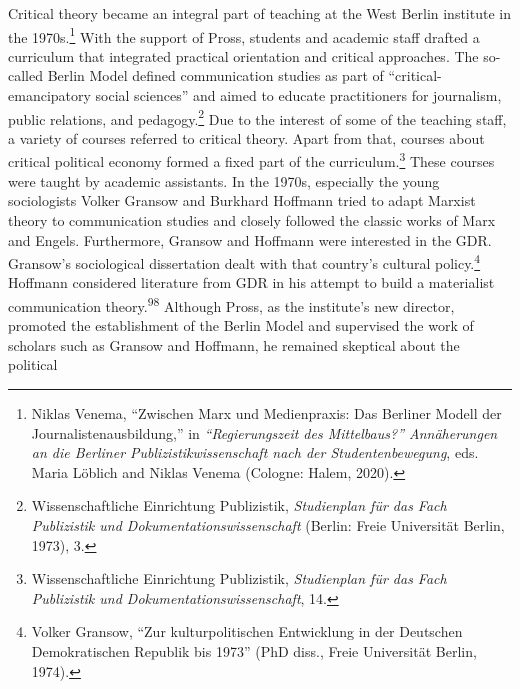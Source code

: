 \documentclass{tufte-handout}
\begin{document}
Critical theory became an integral part of teaching at the West Berlin
institute in the 1970s.\footnote{Niklas Venema, ``Zwischen Marx und
  Medienpraxis: Das Berliner Modell der Journalistenausbildung,'' in
  \emph{``Regierungszeit des Mittelbaus?'' Annäherungen an die Berliner
  Publizistikwissenschaft nach der Studentenbewegung}, eds. Maria
  Löblich and Niklas Venema (Cologne: Halem, 2020).} With the support of
Pross, students and academic staff drafted a curriculum that integrated
practical orientation and critical approaches. The so-called Berlin
Model defined communication studies as part of ``critical-emancipatory
social sciences'' and aimed to educate practitioners for journalism,
public relations, and pedagogy.\footnote{Wissenschaftliche Einrichtung
  Publizistik, \emph{Studienplan für das Fach Publizistik und
  Dokumentationswissenschaft} (Berlin: Freie Universität Berlin, 1973),
  3.} Due to the interest of some of the teaching staff, a variety of
courses referred to critical theory. Apart from that, courses about
critical political economy formed a fixed part of the
curriculum.\footnote{Wissenschaftliche Einrichtung Publizistik,
  \emph{Studienplan für das Fach Publizistik und
  Dokumentationswissenschaft}, 14.} These courses were taught by
academic assistants. In the 1970s, especially the young sociologists
Volker Gransow and Burkhard Hoffmann tried to adapt Marxist theory to
communication studies and closely followed the classic works of Marx and
Engels. Furthermore, Gransow and Hoffmann were interested in the GDR.
Gransow's sociological dissertation dealt with that country's cultural
policy.\footnote{Volker Gransow, ``Zur kulturpolitischen Entwicklung in
  der Deutschen Demokratischen Republik bis 1973'' (PhD diss., Freie
  Universität Berlin, 1974).} Hoffmann considered literature from GDR in
his attempt to build a materialist communication theory.\textsuperscript{98}
\newpage
Although Pross, as the institute's new director, promoted the
establishment of the Berlin Model and supervised the work of scholars
such as Gransow and Hoffmann, he remained skeptical about the political
\end{document}
